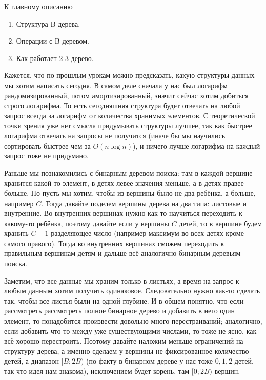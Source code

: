 \label{md2tex11}
\hyperref[md2texREADME]{К главному описанию}


\begin{enumerate}
    \item Структура B-дерева.
    \item Операции с B-деревом.
    \item Как работает 2-3 дерево.
\end{enumerate}


Кажется, что по прошлым урокам можно предсказать, какую структуры данных мы хотим написать сегодня. В самом деле сначала у нас был логарифм рандомизированный, потом амортизированный, значит сейчас хотим добиться строго логарифма. То есть сегодняшняя структура будет отвечать на любой запрос всегда за логарифм от количества хранимых элементов. С теоретической точки зрения уже нет смысла придумывать структуры лучшее, так как быстрее логарифма отвечать на запросы не получится (иначе бы мы научились сортировать быстрее чем за $O(n \log n)$), и ничего лучше логарифма на каждый запрос тоже не придумано.


Раньше мы познакомились с бинарным деревом поиска: там в каждой вершине хранится какой-то элемент, в детях левее значения меньше, а в детях правее -- больше. Но пусть мы хотим, чтобы из вершины было не два ребёнка, а больше, например $C$. Тогда давайте поделем вершины дерева на два типа: листовые и внутренние. Во внутренних вершинах нужно как-то научиться переходить к какому-то ребёнка, поэтому давайте если у вершины $C$ детей, то в вершине будем хранить $C - 1$ разделяющее число (например максимум во всех детях кроме самого правого). Тогда во внутренних вершинах сможем переходить к правильным вершинам детям и дальше всё аналогично бинарным деревьям поиска.

Заметим, что все данные мы храним только в листьях, а время на запрос к любым данным хотим получить одинаковое. Следовательно нужно как-то сделать так, чтобы все листья были на одной глубине. И в общем понятно, что если рассмотреть рассмотреть полное бинарное дерево и добавить в него один элемент, то понадобится произвести довольно много перестраиваний; аналогично, если добавить что-то между уже существующими числами, то тоже не ясно, как всё хорошо перестроить. Поэтому давайте наложим меньше ограничений на структуру дерева, а именно сделаем у вершины не фиксированное количество детей, а диапазон $[B; 2B)$ (по факту в бинарном дереве у нас тоже $0, 1, 2$ детей, так что идея нам знакома), исключением будет корень, там $[0; 2B)$ вершин.


